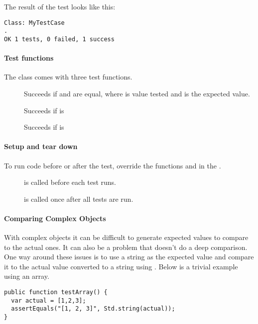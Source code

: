 
The result of the test looks like this:
\begin{lstlisting} 
Class: MyTestCase
.
OK 1 tests, 0 failed, 1 success
\end{lstlisting} 

\paragraph{Test functions}
The  class comes with three test functions.

\begin{description}
	\item[] Succeeds if  and  are equal, where  is value tested and  is the expected value.
	\item[] Succeeds if  is 
	\item[] Succeeds if  is 
\end{description}

\paragraph{Setup and tear down}

To run code before or after the test, override the functions  and  in the . 

\begin{description}
	\item[] is called before each test runs.
	\item[] is called once after all tests are run.
\end{description}


\paragraph{Comparing Complex Objects}

With complex objects it can be difficult to generate expected values to compare to the actual ones. It can also be a problem that  doesn't do a deep comparison. One way around these issues is to use a string as the expected value and compare it to the actual value converted to a string using . Below is a trivial example using an array.

\begin{lstlisting} 
public function testArray() {
  var actual = [1,2,3];
  assertEquals("[1, 2, 3]", Std.string(actual));
}
\end{lstlisting} 
